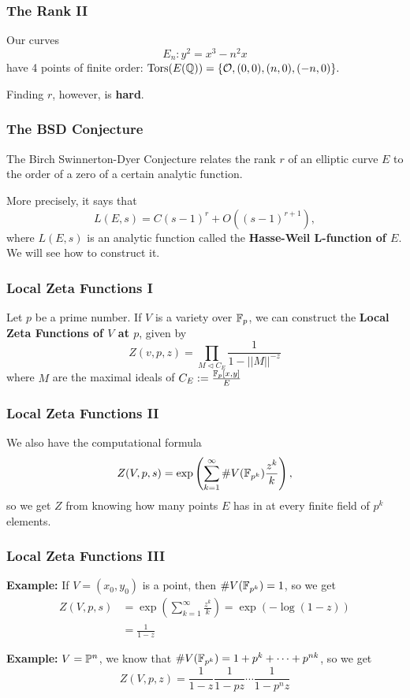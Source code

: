 \documentclass{beamer}
\begin{document}
\begin{frame}
  \frametitle{The Rank II}
  \begin{theorem}
    Our curves
    \[E_n : y^2 = x^3 - n^2 x\]
    have 4 points of finite order: ${\text{\normalfont Tors}}(E({\mathbb Q})) = \{{\mathcal O}, (0,0), (n, 0), (-n,0)\}.$
  \end{theorem} \pause
  \bigskip

  Finding $r$, however, is \textbf{hard}.
  
\end{frame}
 
\begin{frame}
  \frametitle{The BSD Conjecture}
  The Birch Swinnerton-Dyer Conjecture relates the rank $r$ of an elliptic
  curve $E$ to the order of a zero of a certain analytic function. \pause

  More precisely, it says that
  \[L(E,s) = C (s-1)^r + O((s-1)^{r+1}),\]
  where $L(E,s)$ is an analytic function called the \textbf{Hasse-Weil
    L-function of $E$}. We will see how to construct it.
\end{frame}
 
\begin{frame}
  \frametitle{Local Zeta Functions I}
  Let $p$ be a prime number.
  If $V$ is a variety over $\mathbb{F}_p$, we can construct the \textbf{Local Zeta
    Functions of $V$ at $p$}, given by
  \[Z(v,p,z) = \prod\limits_{M \triangleleft C_E} \frac{1}{1 - ||M||^{-z}}\]
  where $M$ are the maximal ideals of $C_E := \frac{\mathbb{F}_p[x,y]}{E}$ 
  
\end{frame}

\begin{frame}
  \frametitle{Local Zeta Functions II}
  We also have the computational formula
  \[Z(V,p,s) = \exp \left( \sum\limits_{k=1}^\infty \# V(\mathbb{F}_{p^k})
      \frac{z^k}{k} \right),\] 
  so we get $Z$ from knowing how many points $E$ has in at every finite field of
  $p^k$ elements.
\end{frame}

\begin{frame}
  \frametitle{Local Zeta Functions III}
  \textbf{Example:} If $V = (x_0,y_0)$ is a point, then $\# V(\mathbb{F}_{p^k}) = 1$, so we get
  \begin{equation*}
    \begin{split}
      Z(V,p,s) &= \exp \left( \sum\limits_{k=1}^\infty \frac{z^k}{k} \right)
      = \exp \left( -\log (1-z) \right) \\
      &= \frac{1}{1-z}
    \end{split}
  \end{equation*} \pause

  \textbf{Example:} $V = {\mathbb P}^n$, we know that $\# V(\mathbb{F}_{p^k}) = 1 + p^k + \cdots +
  p^{nk}$, so we get 
  \[Z(V,p,z) = \frac{1}{1-z} \frac{1}{1-pz}\cdots \frac{1}{1-p^nz}\]
\end{frame} 
\end{document}
